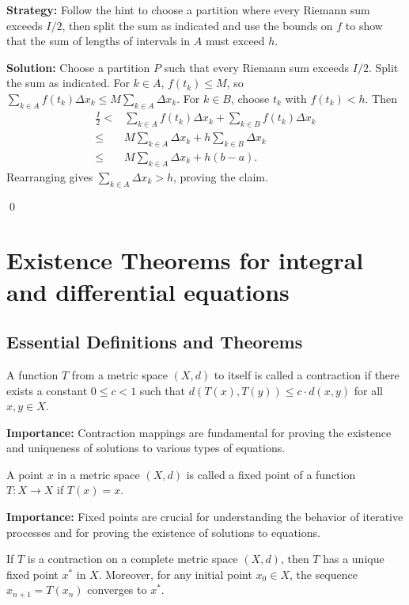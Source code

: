 \noindent\textbf{Strategy:} Follow the hint to choose a partition where every Riemann sum exceeds $I/2$, then split the sum as indicated and use the bounds on $f$ to show that the sum of lengths of intervals in $A$ must exceed $h$.

\bigskip\noindent\textbf{Solution:}
Choose a partition $P$ such that every Riemann sum exceeds $I/2$. Split the sum as indicated. For $k\in A$, $f(t_k)\le M$, so $\sum_{k\in A} f(t_k)\Delta x_k\le M\sum_{k\in A}\Delta x_k$. For $k\in B$, choose $t_k$ with $f(t_k)<h$. Then
\begin{align*}
\frac{I}{2}<&\sum_{k\in A} f(t_k)\Delta x_k+\sum_{k\in B} f(t_k)\Delta x_k\\
\le & M\sum_{k\in A}\Delta x_k + h\sum_{k\in B}\Delta x_k\\
\le & M\sum_{k\in A}\Delta x_k + h(b-a).
\end{align*}
Rearranging gives $\sum_{k\in A}\Delta x_k>h$, proving the claim.


\qed
\section{Existence Theorems for integral and differential equations}

\subsection*{Essential Definitions and Theorems}

\begin{definition}
A function $T$ from a metric space $(X, d)$ to itself is called a contraction if there exists a constant $0 \leq c < 1$ such that $d(T(x), T(y)) \leq c \cdot d(x, y)$ for all $x, y \in X$.
\end{definition}

\noindent\textbf{Importance:} Contraction mappings are fundamental for proving the existence and uniqueness of solutions to various types of equations.

\begin{definition}
A point $x$ in a metric space $(X, d)$ is called a fixed point of a function $T: X \to X$ if $T(x) = x$.
\end{definition}

\noindent\textbf{Importance:} Fixed points are crucial for understanding the behavior of iterative processes and for proving the existence of solutions to equations.

\begin{theorem}
If $T$ is a contraction on a complete metric space $(X, d)$, then $T$ has a unique fixed point $x^*$ in $X$. Moreover, for any initial point $x_0 \in X$, the sequence $x_{n+1} = T(x_n)$ converges to $x^*$.
\end{theorem}

